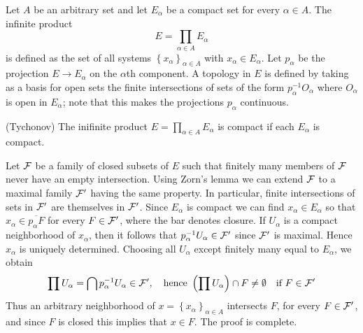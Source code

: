 Let $A$ be an arbitrary set and let $E_{\alpha}$ be a compact set for
every $\alpha\in A$. The infinite product
\begin{displaymath}
  E=\prod_{\alpha\in A}E_{\alpha}
\end{displaymath}
is defined as the set of all systems $\left\{ x_{\alpha}
\right\}_{\alpha\in A}$ with $x_{\alpha}\in E_{\alpha}$. Let
$p_{\alpha}$ be the projection $E\to E_{\alpha}$ on the $\alpha$th
component. A topology in $E$ is defined by taking as a basis for open
sets the finite intersections of sets of the form
$p_{\alpha}^{-1}O_{\alpha}$ where $O_{\alpha}$ is open in
$E_{\alpha}$; note that this makes the projections $p_{\alpha}$
continuous.
\begin{thm}
  (Tychonov) The inifinite product $E=\prod_{\alpha\in A}E_{\alpha}$
  is compact if each $E_{\alpha}$ is compact.
\end{thm}
\begin{prf}
  Let $\mathcal{F}$ be a family of closed subsets of $E$ such that finitely
  many members of $\mathcal{F}$ never have an empty intersection. Using Zorn's
  lemma we can extend $\mathcal{F}$ to a maximal family $\mathcal{F}'$ having the same
  property. In particular, finite intersections of sets in $\mathcal{F}'$ are
  themselves in $\mathcal{F}'$. Since $E_{\alpha}$ is compact we can find
  $x_{\alpha}\in E_{\alpha}$ so that
  $x_{\alpha}\in\overline{p_{\alpha}F}$ for every $F\in\mathcal{F}'$, where the
  bar denotes closure. If $U_{\alpha}$ is a compact neighborhood of
  $x_{\alpha}$, then it follows that $p_{\alpha}^{-1}U_{\alpha}\in\mathcal{F}'$
  since $\mathcal{F}'$ is maximal. Hence $x_{\alpha}$ is uniquely
  determined. Choosing all $U_{\alpha}$ except finitely many equal to
  $E_{\alpha}$, we obtain
  \begin{displaymath}
    \prod U_{\alpha}=\bigcap
    p_{\alpha}^{-1}U_{\alpha}\in\mathcal{F}',\quad\text{hence } \left( \prod
      U_{\alpha} \right)\cap F\neq\emptyset \quad \text{if } F\in\mathcal{F}'
  \end{displaymath}
  Thus an arbitrary neighborhood of $x=\left\{ x_{\alpha}
  \right\}_{\alpha\in A}$ intersects $F$, for every $F\in\mathcal{F}'$, and
  since $F$ is closed this implies that $x\in F$. The proof is complete.
\end{prf}

